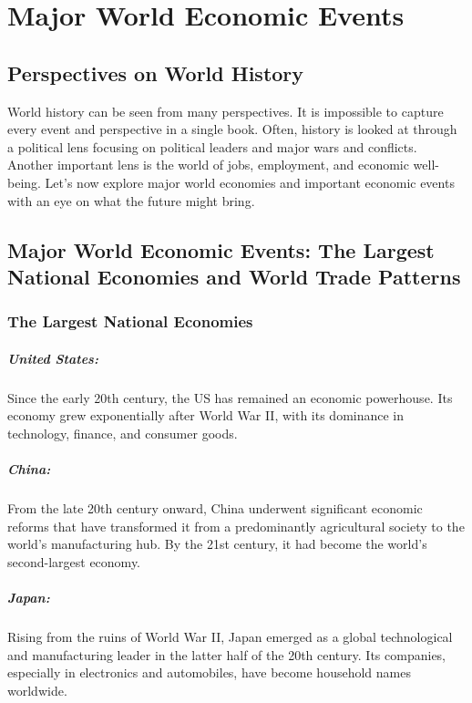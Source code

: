 \chapter{Major World Economic Events}
\section*{Perspectives on World History}
World history can be seen from many perspectives. It is impossible to capture every event and perspective in a single book. Often, history is looked at through a political lens focusing on political leaders and major wars and conflicts. Another important lens is the world of jobs, employment, and economic well-being. Let's now explore major world economies and important economic events with an eye on what the future might bring.

\section*{Major World Economic Events: The Largest National Economies and World Trade Patterns}
\subsection*{The Largest National Economies}

\paragraph{United States:}
Since the early 20th century, the US has remained an economic powerhouse. Its economy grew exponentially after World War II, with its dominance in technology, finance, and consumer goods.

\paragraph{China:}
From the late 20th century onward, China underwent significant economic reforms that have transformed it from a predominantly agricultural society to the world's manufacturing hub. By the 21st century, it had become the world's second-largest economy.

\paragraph{Japan:}
Rising from the ruins of World War II, Japan emerged as a global technological and manufacturing leader in the latter half of the 20th century. Its companies, especially in electronics and automobiles, have become household names worldwide.

